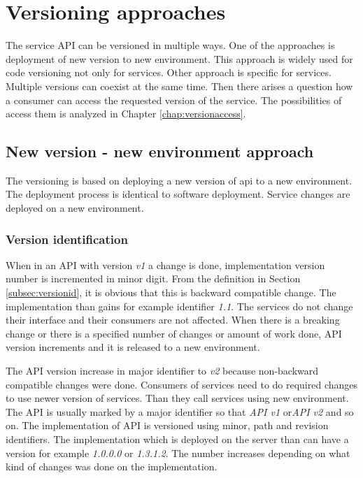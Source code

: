 \chapter{Versioning approaches}
\label{chap:versioning-approaches}

The service API can be versioned in multiple ways. One of the approaches is deployment of new version to new environment. This approach is widely used for code versioning not only for services. Other approach is specific for services. Multiple versions can coexist at the same time. Then there arises a question how a consumer can access the requested version of the service. The possibilities of access them is analyzed in Chapter \ref{chap:versionaccess}.


\section{New version - new environment approach}

The versioning is based on deploying a new version of \gls{api} to a new environment. The deployment process is identical to software deployment. Service changes are deployed on a new environment. %

\subsection{Version identification}
When in an API with version \emph{v1} a change is done, implementation version number is incremented in minor digit. From the definition in Section \ref{subsec:versionid}, it is obvious that this is backward compatible change. The implementation than gains for example identifier \emph{1.1}. The services do not change their interface and their consumers are not affected. 
When there is a breaking change or there is a specified number of changes or amount of work done, API version increments and it is released to a new environment. 

The API version increase in major identifier to \emph{v2} because non-backward compatible changes were done. Consumers of services need to do required changes to use newer version of services. Than they call services using new environment. 
The API is usually marked by a major identifier so that \emph{API v1} or\emph{API v2} and so on.
The implementation of API is versioned using minor, path and revision identifiers. The implementation which is deployed on the server than can have a version for example \emph{1.0.0.0} or \emph{1.3.1.2}. The number increases depending on what kind of changes was done on the implementation.

